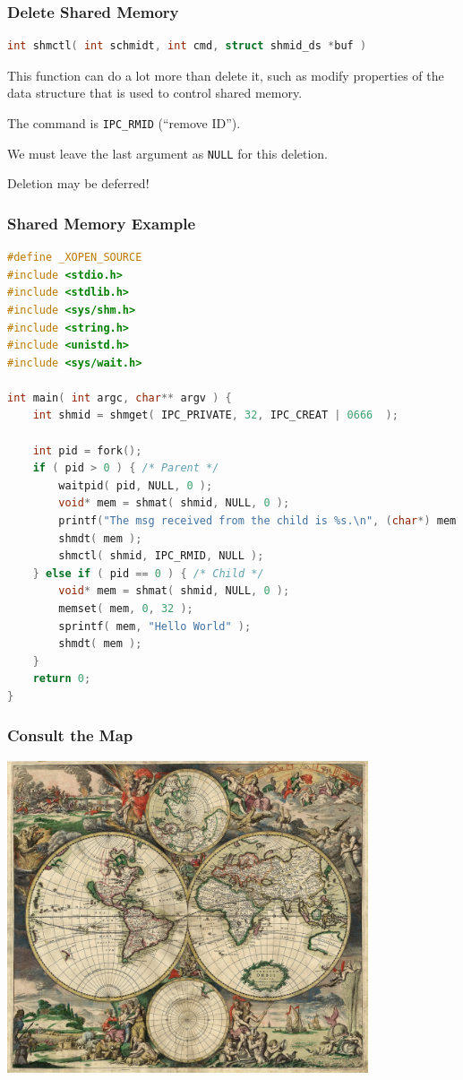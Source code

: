 \begin{frame}[fragile]
\frametitle{Delete Shared Memory}
\begin{lstlisting}[language=C]
int shmctl( int schmidt, int cmd, struct shmid_ds *buf )
\end{lstlisting}

This function can do a lot more than delete it, such as modify properties of the data structure that is used to control shared memory.

The command is  \texttt{IPC\_RMID} (``remove ID'').

We must leave the last argument as \texttt{NULL} for this deletion. 

Deletion may be deferred!

\end{frame}


\begin{frame}[fragile]
\frametitle{Shared Memory Example}
\begin{lstlisting}[language=C]
#define _XOPEN_SOURCE
#include <stdio.h>
#include <stdlib.h>
#include <sys/shm.h>
#include <string.h>
#include <unistd.h>
#include <sys/wait.h>

int main( int argc, char** argv ) { 
    int shmid = shmget( IPC_PRIVATE, 32, IPC_CREAT | 0666  );  

    int pid = fork();
    if ( pid > 0 ) { /* Parent */
        waitpid( pid, NULL, 0 );
        void* mem = shmat( shmid, NULL, 0 );
        printf("The msg received from the child is %s.\n", (char*) mem );
        shmdt( mem );
        shmctl( shmid, IPC_RMID, NULL );
    } else if ( pid == 0 ) { /* Child */
        void* mem = shmat( shmid, NULL, 0 );
        memset( mem, 0, 32 );
        sprintf( mem, "Hello World" );
        shmdt( mem );
    }   
    return 0;
}
\end{lstlisting}


\end{frame}


\begin{frame}
\frametitle{Consult the Map}

\begin{center}
	\includegraphics[width=0.8\textwidth]{images/worldmap.jpg}
\end{center}


\end{frame}


